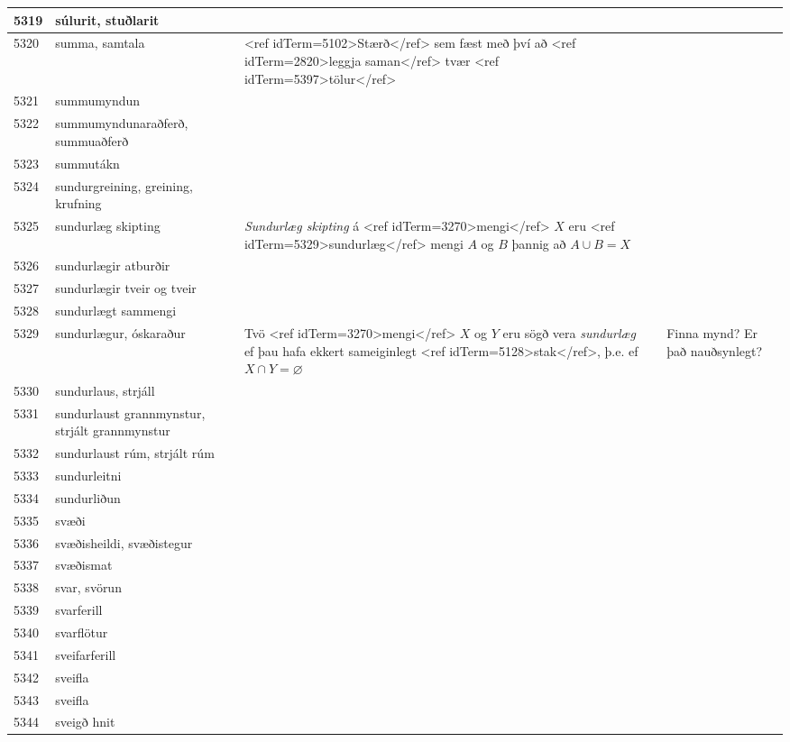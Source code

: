 \begin{longtable}{p{}|p{}|p{}|p{}|p{}}
\hline
5319 & súlurit, stuðlarit &  &  &  \\
\hline
5320 & summa, samtala & <ref idTerm=5102>Stærð</ref> sem fæst með því að <ref idTerm=2820>leggja saman</ref> tvær <ref idTerm=5397>tölur</ref> &  & \\
\hline
5321 & summumyndun &  &  &  \\
\hline
5322 & summumyndunaraðferð, summuaðferð &  &  &  \\
\hline
5323 & summutákn &  &  &  \\
\hline
5324 & sundurgreining, greining, krufning &  &  &  \\
\hline
5325 & sundurlæg skipting & \textit{Sundurlæg skipting} á <ref idTerm=3270>mengi</ref> $X$ eru <ref idTerm=5329>sundurlæg</ref> mengi $A$ og $B$ þannig að $A \cup B = X$ &  & \\
\hline
5326 & sundurlægir atburðir &  &  &  \\
\hline
5327 & sundurlægir tveir og tveir &  &  &  \\
\hline
5328 & sundurlægt sammengi &  &  &  \\
\hline
5329 & sundurlægur, óskaraður & Tvö <ref idTerm=3270>mengi</ref> $X$ og $Y$ eru sögð vera \textit{sundurlæg} ef þau hafa ekkert sameiginlegt <ref idTerm=5128>stak</ref>, þ.e. ef $X \cap Y = \varnothing$ &  & Finna mynd? Er það nauðsynlegt? \\
\hline
5330 & sundurlaus, strjáll &  &  &  \\
\hline
5331 & sundurlaust grannmynstur, strjált grannmynstur &  &  &  \\
\hline
5332 & sundurlaust rúm, strjált rúm &  &  &  \\
\hline
5333 & sundurleitni &  &  &  \\
\hline
5334 & sundurliðun &  &  &  \\
\hline
5335 & svæði &  &  &  \\
\hline
5336 & svæðisheildi, svæðistegur &  &  &  \\
\hline
5337 & svæðismat &  &  &  \\
\hline
5338 & svar, svörun &  &  &  \\
\hline
5339 & svarferill &  &  &  \\
\hline
5340 & svarflötur &  &  &  \\
\hline
5341 & sveifarferill &  &  &  \\
\hline
5342 & sveifla &  &  &  \\
\hline
5343 & sveifla &  &  &  \\
\hline
5344 & sveigð hnit &  &  &  \\

\end{longtable}
